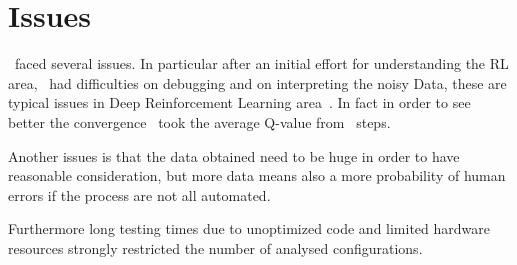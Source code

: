 
\section{Issues}

\Auth~faced several issues. In particular after an initial effort for understanding the RL area, \auth~had difficulties on debugging and on interpreting the noisy Data, these are typical issues in Deep Reinforcement Learning area~\cite{rlblogpost}. In fact in order to see better the convergence \auth~took the average Q-value from \numepoch~steps.

Another issues is that the data obtained need to be huge in order to have reasonable consideration, but more data means also a more probability of human errors if the process are not all automated.

Furthermore long testing times due to unoptimized code and limited hardware resources strongly restricted the number of analysed configurations.

